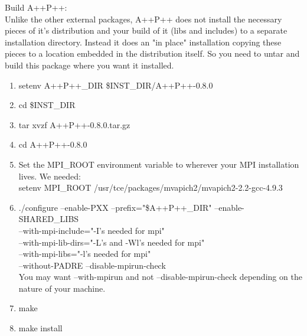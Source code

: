 \documentclass[11pt]{amsart}
\begin{document}
Build A++P++: \\
Unlike the other external packages, A++P++ does not install the necessary
pieces of it's distribution and your build of it (libs and includes) to a
separate installation directory.  Instead it does an "in place" installation
copying these pieces to a location embedded in the distribution itself.  So
you need to untar and build this package where you want it installed.
\begin{enumerate}
\item setenv A++P++\_DIR \$INST\_DIR/A++P++-0.8.0
\item cd \$INST\_DIR
\item tar xvzf A++P++-0.8.0.tar.gz
\item cd A++P++-0.8.0
\item Set the MPI\_ROOT environment variable to wherever your MPI installation
lives.  We needed: \\
setenv MPI\_ROOT /usr/tce/packages/mvapich2/mvapich2-2.2-gcc-4.9.3
\item ./configure --enable-PXX --prefix="\$A++P++\_DIR" --enable-SHARED\_LIBS \\
--with-mpi-include="-I's needed for mpi" \\
--with-mpi-lib-dirs="-L's and -Wl's needed for mpi" \\
--with-mpi-libs="-l's needed for mpi" \\
--without-PADRE --disable-mpirun-check \\
You may want --with-mpirun and not --disable-mpirun-check depending on the
nature of your machine.
\item make
\item make install
\end{enumerate}
\end{document}
